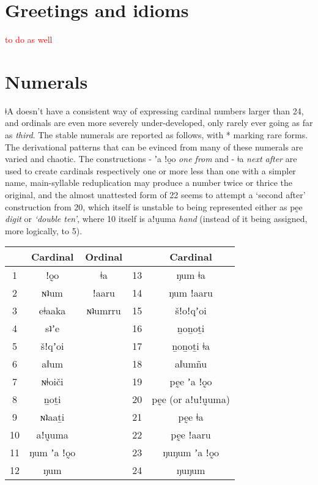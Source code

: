 \documentclass[11pt,a5paper]{book}
\newcommand{\qcn}[1]{\textcolor{AccentText}{\large#1}}
\newcommand{\langname}{\qcn{ǂA}}
\newcommand{\transl}[2]{\qcn{#1} \emph{#2}}
\newcommand{\cmnt}[1]{\textcolor{red}{#1}}
\begin{document}
\section{Greetings and idioms}

\cmnt{to do as well}

\section{Numerals}

\langname{} doesn't have a consistent way of expressing cardinal numbers larger than 24, and ordinals are even more severely under-developed, only rarely ever going as far as \emph{third}. The stable numerals are reported as follows, with * marking rare forms. The derivational patterns that can be evinced from many of these numerals are varied and chaotic. The constructions \transl{- ʼa ǃo̰o}{one from} and \transl{- ǂa}{next after} are used to create cardinals respectively one or more less than one with a simpler name, main-syllable reduplication may produce a number twice or thrice the original, and the almost unattested form of 22 seems to attempt a `second after' construction from 20, which itself is unstable to being represented either as \transl{pḛe}{digit} or \emph{`double ten'}, where 10 itself is \transl{aǃṵuma}{hand} (instead of it being assigned, more logically, to 5).

\begin{center}

\begin{tabular}{ccccc}
\hline
& Cardinal & Ordinal & & Cardinal\\ \hline \hline
1 & \qcn{ǃo̰o} & \qcn{ǂa} & 13 & \qcn{ŋum ǂa} \\ \hline
2 & \qcn{ɴʇum} & \qcn{ǃaaru} & 14  &  \qcn{ŋum ǃaaru} \\ \hline
3 & \qcn{eǂaaka} & \qcn{*ɴʇumrru} & 15 & \qcn{šǃoǃqʼoi} \\ \hline
4 & \qcn{sʇʼe} & & 16 & \qcn{ṉoṉoṯi} \\ \hline
5 & \qcn{šǃqʼoi} & & 17 & \qcn{ṉoṉoṯi ǂa} \\ \hline
6 & \qcn{aǁum} & & 18 & \qcn{aǁumñu}  \\ \hline
7 & \qcn{ɴǂoiči} & & 19 & \qcn{*pḛe ʼa ǃo̰o}\\ \hline
8 & \qcn{ṉoṯi} && 20 & \qcn{pḛe} (or \qcn{*aǃuǃṵuma})\\ \hline
9 & \qcn{ɴʇaaṯi} & & 21 & \qcn{pḛe ǂa} \\ \hline
10 & \qcn{aǃṵuma} & & 22 & \qcn{*pḛe ǃaaru} \\ \hline
11 & \qcn{ŋum ʼa ǃo̰o} & & 23 & \qcn{*ŋuŋum ʼa ǃo̰o} \\ \hline
12 & \qcn{ŋum}  & & 24 & \qcn{ŋuŋum} \\ \hline 
\end{tabular}

\end{center}
\end{document}
